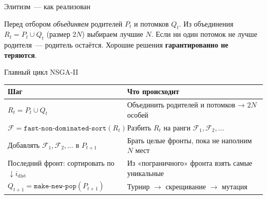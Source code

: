 \documentclass[aspectratio=169,11pt]{beamer}
\begin{document}
\begin{frame}{Элитизм~--- как реализован}
  \begin{exampleblock}{}
    Перед отбором \emph{объединяем} родителей $P_t$ и потомков $Q_t$.
    Из объединения $R_t = P_t \cup Q_t$ (размер $2N$) выбираем лучшие $N$.
    Если ни один потомок не лучше родителя~--- родитель остаётся.
    Хорошие решения \textbf{гарантированно не теряются}.
  \end{exampleblock}
  \vspace{0.3cm}
  \centering
\end{frame}

\begin{frame}{Главный цикл NSGA-II}
  \footnotesize
  \begin{tabular}{p{}p{}}
    \toprule
    \textbf{Шаг} & \textbf{Что происходит} \\
    \midrule
    $R_t = P_t \cup Q_t$
      & Объединить родителей и потомков → $2N$ особей \\[4pt]
    $\mathcal{F} = \texttt{fast-non-dominated-sort}(R_t)$
      & Разбить $R_t$ на ранги $\mathcal{F}_1, \mathcal{F}_2, \ldots$ \\[4pt]
    Добавлять $\mathcal{F}_1, \mathcal{F}_2,\ldots$ в $P_{t+1}$
      & Брать целые фронты, пока не наполним $N$ мест \\[4pt]
    Последний фронт: сортировать по $\downarrow i_{\mathrm{dist}}$
      & Из «пограничного» фронта взять самые уникальные \\[4pt]
    $Q_{t+1} = \texttt{make-new-pop}(P_{t+1})$
      & Турнир $\to$ скрещивание $\to$ мутация \\
    \bottomrule
  \end{tabular}
\end{frame}
\end{document}
